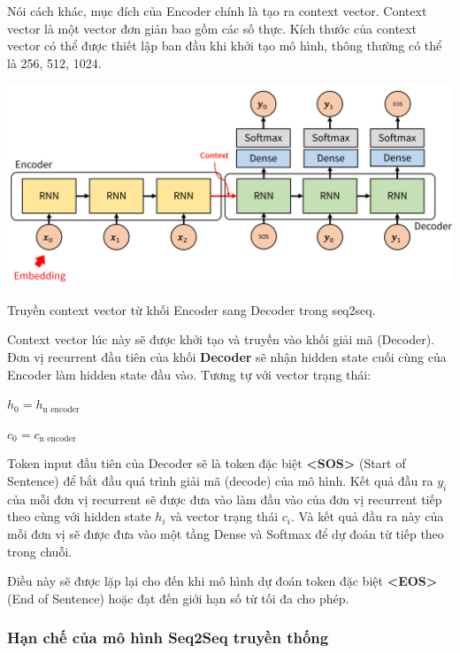 \documentclass[a4paper, 12pt, openany]{book}
\begin{document}
Nói cách khác, mục đích của Encoder chính là tạo ra context vector. Context vector
là một vector đơn giản bao gồm các số thực. Kích thước của context vector có thể được
thiết lập ban đầu khi khởi tạo mô hình, thông thường có thể là 256, 512, 1024.

\begin{minipage}{\linewidth}
    \captionsetup{type=figure}
    \centering
    \includegraphics[width=\linewidth]{./assets/images/seq2seq_detail.png}
    \caption{Truyền context vector từ khối Encoder sang Decoder trong \ac{seq2seq}.}
\end{minipage}
\vspace{0.5cm}

Context vector lúc này sẽ được khởi tạo và truyền vào khối giải mã (Decoder).
Đơn vị recurrent đầu tiên của khối \textbf{Decoder} sẽ nhận hidden state cuối cùng của Encoder làm hidden state đầu vào.
Tương tự với vector trạng thái:

\begin{center}

    \(h_0 = h_{\text{n encoder}}\)

    \(c_0 = c_{\text{n encoder}}\)
\end{center}

Token input đầu tiên của Decoder sẽ là token đặc biệt \textbf{<SOS>} (Start of Sentence) để bắt đầu quá trình giải mã (decode) của mô hình.
Kết quả đầu ra \(y_i\) của mỗi đơn vị recurrent sẽ được đưa vào làm đầu vào của đơn vị recurrent tiếp theo cùng với hidden state \(h_i\) và vector trạng thái \(c_i\).
Và kết quả đầu ra này của mỗi đơn vị sẽ được đưa vào một tầng Dense và Softmax để dự đoán từ tiếp theo trong chuỗi.

Điều này sẽ được lặp lại cho đến khi mô hình dự đoán token đặc biệt \textbf{<EOS>} (End of Sentence) hoặc đạt đến giới hạn số từ tối đa cho phép.

\subsubsection{Hạn chế của mô hình Seq2Seq truyền thống}
\end{document}
